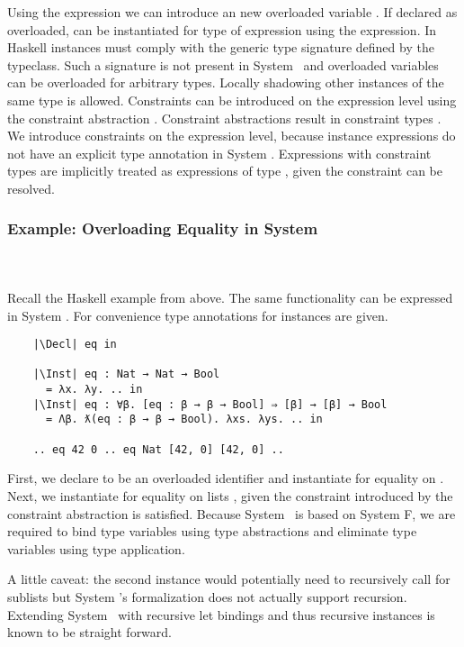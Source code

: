 \noindent Using the  expression we can introduce an new overloaded variable . 
If declared as overloaded,  can be instantiated for type  of expression  using the  expression.
In Haskell instances must comply with the generic type signature defined by the typeclass. Such a signature is not present in System \Fo\ and overloaded variables can be overloaded for arbitrary types.
Locally shadowing other instances of the same type is allowed.
Constraints can be introduced on the expression level using the constraint abstraction . 
Constraint abstractions result in constraint types . 
We introduce constraints on the expression level, because instance expressions do not have an explicit type annotation in System \Fo.
Expressions with constraint types  are implicitly treated as expressions of type , given the constraint  can be resolved.

\subsubsection{Example: Overloading Equality in System \Fo}\hfill\\\\
Recall the Haskell example from above. 
The same functionality can be expressed in System \Fo. 
For convenience type annotations for instances are given.
\begin{verbatim}
    |\Decl| eq in

    |\Inst| eq : Nat → Nat → Bool 
      = λx. λy. .. in
    |\Inst| eq : ∀β. [eq : β → β → Bool] ⇒ [β] → [β] → Bool 
      = Λβ. ƛ(eq : β → β → Bool). λxs. λys. .. in

    .. eq 42 0 .. eq Nat [42, 0] [42, 0] .. 
\end{verbatim} 
First, we declare  to be an overloaded identifier and instantiate  for equality on . 
Next, we instantiate  for equality on lists \inl{[β]}, given the constraint  introduced by the constraint abstraction  is satisfied. 
Because System \Fo\ is based on System F, we are required to bind type variables using type abstractions  and eliminate type variables using type application. 

\noindent A little caveat: the second instance would potentially need to recursively call  for sublists but System \Fo's formalization does not actually support recursion. Extending System \Fo\ with recursive let bindings and thus recursive instances is known to be straight forward. 

